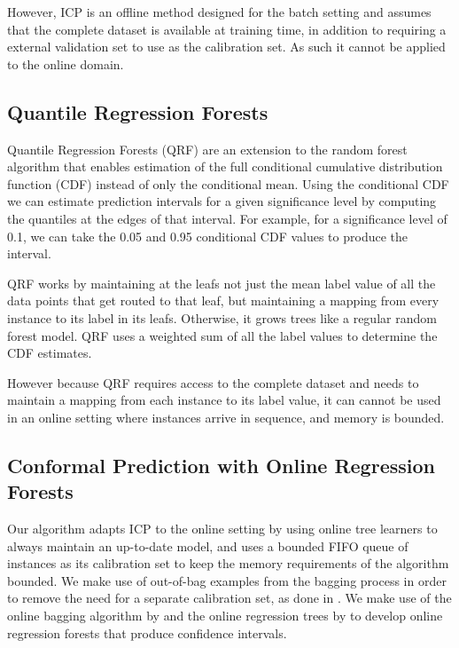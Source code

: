 However, ICP is an offline method designed for the batch setting and assumes that the complete
dataset is available at training time, in addition to requiring a external
validation set to use as the calibration set. As such it cannot be applied to
the online domain.


\subsection{Quantile Regression Forests}

Quantile Regression Forests (QRF) \cite{meinshausen2006quantile} are an extension to
the random forest \cite{random-forests} algorithm that enables estimation
of the full conditional cumulative distribution function (CDF) instead of only
the conditional mean. Using the conditional CDF we can estimate prediction
intervals for a given significance level by computing the quantiles at the
edges of that interval. For example, for a significance level of 0.1,
we can take the 0.05 and 0.95 conditional CDF values to produce the interval.

QRF works by maintaining at the leafs not just the mean label value of all
the data points that get routed to that leaf, but maintaining a mapping
from every instance to its label in its leafs. Otherwise, it grows trees
like a regular random forest model. QRF uses a weighted sum of all the label
values to determine the CDF estimates.

However because QRF requires access to the complete dataset and needs to maintain
a mapping from each instance to its label value, it can cannot be used in an online
setting where instances arrive in sequence, and memory is bounded.

\subsection{Conformal Prediction with Online Regression Forests}

Our algorithm adapts ICP to the online setting by using online tree learners
to always maintain an up-to-date model, and uses a bounded FIFO queue of instances
as its calibration set to keep the memory requirements of the algorithm bounded. We make use of
out-of-bag examples from the bagging process in order to remove the need
for a separate calibration set, as done in \cite{rf-cp-oob}. We make use of
the online bagging algorithm by \citet{Oza2001online} and the online
regression trees by \citet{fimt} to develop online regression forests
that produce confidence intervals.

